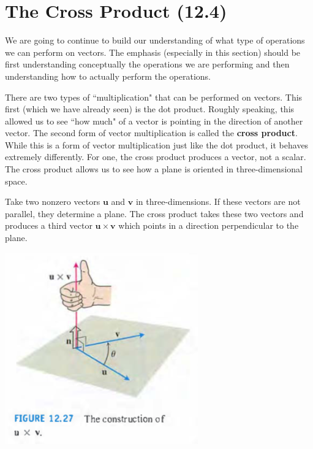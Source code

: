 \documentclass[12pt, letter]{article}
\theoremstyle{plain}
\numberwithin{theorem}{section}
\theoremstyle{definition}
\begin{document}
\section{The Cross Product (12.4)}

We are going to continue to build our understanding of what type of operations we can perform on vectors. The emphasis (especially in this section) should be first understanding conceptually the operations we are performing and then understanding how to actually perform the operations.

\bigskip

There are two types of ``multiplication" that can be performed on vectors. This first (which we have already seen) is the dot product. Roughly speaking, this allowed us to see ``how much" of a vector is pointing in the direction of another vector. The second form of vector multiplication is called the \textbf{cross product}. While this is a form of vector multiplication just like the dot product, it behaves extremely differently. For one, the cross product produces a vector, not a scalar. The cross product allows us to see how a plane is oriented in three-dimensional space. 

\bigskip

\hrulefill

\bigskip

Take two nonzero vectors $\bm{u}$ and $\bm{v}$ in three-dimensions. If these vectors are not parallel, they determine a plane. The cross product takes these two vectors and produces a third vector $\bm{u} \times \bm{v}$ which points in a direction perpendicular to the plane.

\bigskip

\begin{center}
\includegraphics[scale=0.8]{m1_f10}
\end{center}
\end{document}
